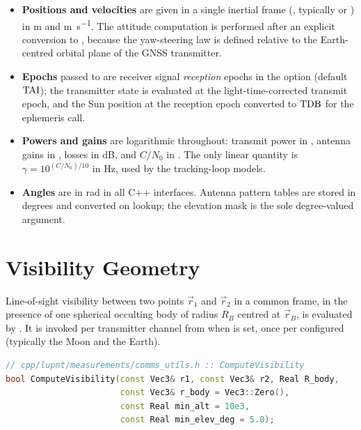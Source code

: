 \begin{itemize}[leftmargin=1.4em]
  \item \textbf{Positions and velocities} are given in a single inertial frame
        (, typically  or
        ) in \si{\meter} and \si{\meter\per\second}.  The
        attitude computation is performed after an explicit conversion to
        , because the yaw-steering law is defined relative to
        the Earth-centred orbital plane of the GNSS transmitter.
  \item \textbf{Epochs} passed to  are receiver signal
        \emph{reception} epochs in the  option
        (default $\mathrm{TAI}$); the transmitter state is evaluated at the
        light-time-corrected transmit epoch, and the Sun position at the
        reception epoch converted to $\mathrm{TDB}$ for the ephemeris call.
  \item \textbf{Powers and gains} are logarithmic throughout: transmit power in
        \si{\dBW}, antenna gains in \si{\dBi}, losses in \si{\dB}, and
        $C/N_0$ in \si{\dBHz}.  The only linear quantity is
        $\gamma = 10^{(C/N_0)/10}$ in \si{\hertz}, used by the tracking-loop
        models.
  \item \textbf{Angles} are in \si{\radian} in all C++ interfaces.  Antenna
        pattern tables are stored in degrees and converted on lookup; the
        elevation mask  is the sole degree-valued
        argument.
\end{itemize}

\section{Visibility Geometry}
\label{sec:lb-visibility}

Line-of-sight visibility between two points $\vec{r}_1$ and $\vec{r}_2$ in a
common frame, in the presence of one spherical occulting body of radius $R_B$
centred at $\vec{r}_B$, is evaluated by .  It is invoked
per transmitter channel from  when
 is set, once per configured
 (typically the Moon and the Earth).

\begin{lstlisting}[language=cpp, caption={Visibility predicate signature and
defaults.}, label={lst:lb-visibility-sig}]
// cpp/lupnt/measurements/comms_utils.h :: ComputeVisibility
bool ComputeVisibility(const Vec3& r1, const Vec3& r2, Real R_body,
                       const Vec3& r_body = Vec3::Zero(),
                       const Real min_alt = 10e3,
                       const Real min_elev_deg = 5.0);
\end{lstlisting}

